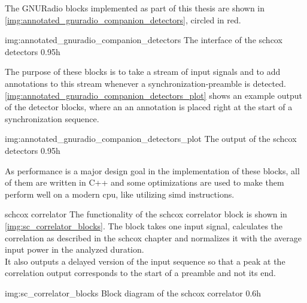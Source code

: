 The GNURadio blocks implemented as part of this thesis are
shown in \autoref{img:annotated_gnuradio_companion_detectors},
circled in red.

             {img:annotated_gnuradio_companion_detectors}
             {The interface of the \gls{schcox} detectors}
             {0.95}{h}

The purpose of these blocks is to take a stream of input signals
and to add annotations to this stream whenever a synchronization-preamble
is detected.
\autoref{img:annotated_gnuradio_companion_detectors_plot} shows an example output
of the detector blocks, where an an annotation is placed right at the start of a
synchronization sequence.

             {img:annotated_gnuradio_companion_detectors_plot}
             {The output of the \gls{schcox} detectors}
             {0.95}{h}

As performance is a major design goal in the implementation of these blocks,
all of them are written in C++ and some optimizations are used to make them
perform well on a modern \acrshort{cpu}, like utilizing
\acrshort{simd} instructions.

\begin{subchapter}{\acrlong{schcox} correlator}
  The functionality of the \acrlong{schcox} correlator
  block is shown in \autoref{img:sc_correlator_blocks}.
  The block takes one input signal, calculates the correlation
  as described in the \acrlong{schcox} chapter and normalizes it
  with the average input power in the analyzed duration. \\

  It also outputs a delayed version of the input sequence so that
  a peak at the correlation output corresponds to the start of a
  preamble and not its end.

               {img:sc_correlator_blocks}
               {Block diagram of the \acrlong{schcox} correlator}
               {0.6}{h}


\end{subchapter}

